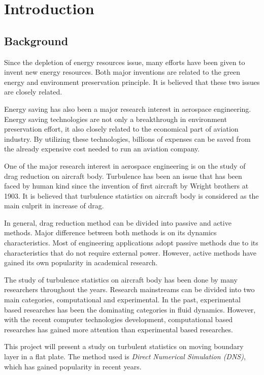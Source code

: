 \chapter{Introduction}
\section{Background}
Since the depletion of energy resources issue, many efforts have been given to invent new energy resources. Both major inventions are related to the green energy and environment preservation principle. It is believed that these two issues are closely related. 

Energy saving has also been a major research interest in aerospace engineering. Energy saving technologies are not only a breakthrough in environment preservation effort, it also closely related to the economical part of aviation industry. By utilizing these technologies, billions of expenses can be saved from the already expensive cost needed to run an aviation company.

One of the major research interest in aerospace engineering is on the study of drag reduction on aircraft body. Turbulence has been an issue that has been faced by human kind since the invention of first aircraft by Wright brothers at 1903. It is believed that turbulence statistics on aircraft body is considered as the main culprit in increase of drag. 

In general, drag reduction method can be divided into passive and active methods. Major difference between both methods is on its dynamics characteristics. Most of engineering applications adopt passive methods due to its characteristics that do not require external power. However, active methods have gained its own popularity in academical research.

The study of turbulence statistics on aircraft body has been done by many researchers throughout the years. Research mainstreams can be divided into two main categories, computational and experimental. In the past, experimental based researches has been the dominating categories in fluid dynamics. However, with the recent computer technologies development, computational based researches has gained more attention than experimental based researches. 

This project will present a study on turbulent statistics on moving boundary layer in a flat plate. The method used is \emph{Direct Numerical Simulation (DNS)}, which has gained popularity in recent years.

